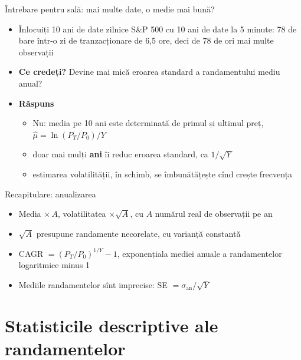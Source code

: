 \begin{frame}{Întrebare pentru sală: mai multe date, o medie mai bună?}
\itemsize{\small}
\begin{itemize}
    \item Înlocuiți 10 ani de date zilnice S\&P 500 cu 10 ani de date la 5 minute: 78 de bare într-o zi de tranzacționare de 6,5 ore, deci de 78 de ori mai multe observații
    \item \textbf{Ce credeți?} Devine mai mică eroarea standard a randamentului mediu anual?
    \item \textbf{Răspuns}
    \begin{itemize}
        \item Nu: media pe 10 ani este determinată de primul și ultimul preț, $\hat\mu = \ln(P_T/P_0)/Y$
        \item doar mai mulți \textbf{ani} îi reduc eroarea standard, ca $1/\sqrt{Y}$
        \item estimarea volatilității, în schimb, se îmbunătățește cînd crește frecvența
    \end{itemize}
\end{itemize}
\end{frame}

\begin{frame}{Recapitulare: anualizarea}
\itemsize{\small}
\begin{itemize}
    \item Media $\times\, A$, volatilitatea $\times \sqrt{A}$, cu $A$ numărul real de observații pe an
    \item $\sqrt{A}$ presupune randamente necorelate, cu varianță constantă
    \item CAGR $= (P_T/P_0)^{1/Y} - 1$, exponențiala mediei anuale a randamentelor logaritmice minus 1
    \item Mediile randamentelor sînt imprecise: SE $= \sigma_{\text{an}}/\sqrt{Y}$
\end{itemize}
\end{frame}


\section{Statisticile descriptive ale randamentelor}

